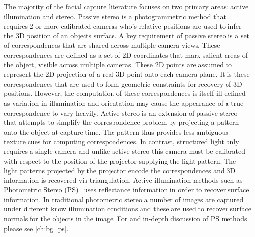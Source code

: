 The majority of the facial capture literature focuses on two primary areas: 
active illumination and
stereo. Passive stereo is a photogrammetric method that requires 2 or more
calibrated cameras who's relative positions are used to infer the 3D position of
an objects surface. A key requirement of passive stereo is a set of
correspondences that are shared across multiple camera views. These
correspondences are defined as a set of 2D coordinates that mark salient areas
of the object, visible across multiple cameras. These 2D points are assumed to
represent the 2D projection of a real 3D point onto each camera plane. It is
these correspondences that are used to form geometric constraints for recovery
of 3D positions. However, the computation of these correspondences is itself
ill-defined as variation in illumination and orientation may cause the
appearance of a true correspondence to vary heavily. Active stereo is an
extension of passive stereo that attempts to simplify the correspondence problem
by projecting a pattern onto the object at capture time. The pattern thus
provides less ambiguous texture cues for computing correspondences. In contrast,
structured light only requires a single camera and unlike active stereo this
camera must be calibrated with respect to the position of the projector
supplying the light pattern. The light patterns projected by the projector
encode the correspondences and 3D information is recovered via triangulation.
Active illumination methods such as 
Photometric Stereo (PS)~\cite{woodham1980photometric} uses reflectance
information in order to recover surface information. In traditional photometric
stereo a number of images are captured under different know illumination
conditions and these are used to recover surface normals for the objects in the
image. For and in-depth discussion of PS methods please see
\cref{ch:bg_ps}.

